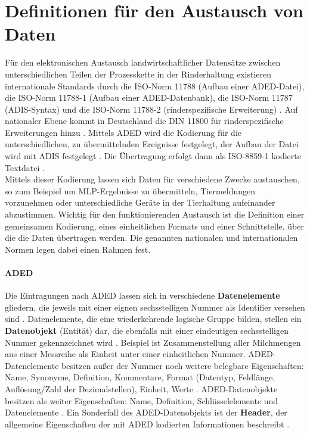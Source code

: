 \section{Definitionen für den Austausch von Daten}
Für den elektronischen Austausch landwirtschaftlicher Datensätze zwischen unterschiedlichen Teilen der Prozesskette in der Rinderhaltung existieren internationale Standards durch die ISO-Norm 11788 (Aufbau einer ADED-Datei), die ISO-Norm 11788-1 (Aufbau einer ADED-Datenbank), die ISO-Norm 11787 (ADIS-Syntax) und die ISO-Norm 11788-2 (rinderspezifische Erweiterung) \autocite[27]{n.n._adis/aded_2015}. Auf nationaler Ebene kommt in Deutschland die DIN 11800 für rinderspezifische Erweiterungen hinzu \autocite[27]{n.n._adis/aded_2015}. Mittels ADED wird die Kodierung für die unterschiedlichen, zu übermittelnden Ereignisse festgelegt, der Aufbau der Datei wird mit ADIS festgelegt \autocite{landeskontrollverband_nrw_e.v._lkv_????}. Die Übertragung erfolgt dann als ISO-8859-1 kodierte Textdatei \autocite[17]{n.n._adis/aded_2015}.\\
Mittels dieser Kodierung lassen sich Daten für verschiedene Zwecke austauschen, so zum Beispiel um MLP-Ergebnisse zu übermitteln, Tiermeldungen vorzunehmen oder unterschiedliche Geräte in der Tierhaltung aufeinander abzustimmen. Wichtig für den funktionierenden Austausch ist die Definition einer gemeinsamen Kodierung, eines einheitlichen Formats und einer Schnittstelle, über die die Daten übertragen werden. Die genannten nationalen und internationalen Normen legen dabei einen Rahmen fest.
\paragraph{ADED}
Die Eintragungen nach ADED lassen sich in verschiedene \textbf{Datenelemente} gliedern, die jeweils mit einer eignen sechsstelligen Nummer als Identifier versehen sind \autocite[16]{n.n._adis/aded_2015}. Datenelemente, die eine wiederkehrende logische Gruppe bilden, stellen ein \textbf{Datenobjekt} (Entität) dar, die ebenfalls mit einer eindeutigen sechsstelligen Nummer gekennzeichnet wird \autocite[17]{n.n._adis/aded_2015}. Beispiel ist Zusammenstellung aller Milchmengen aus einer Messreihe als Einheit unter einer einheitlichen Nummer. ADED-Datenelemente besitzen außer der Nummer noch weitere belegbare Eigenschaften: Name, Synonyme, Definition, Kommentare, Format (Datentyp, Feldlänge, Auflösung/Zahl der Dezimalstellen), Einheit, Werte \autocite[16]{n.n._adis/aded_2015}. ADED-Datenobjekte besitzen als weiter Eigenschaften: Name, Definition, Schlüsselelemente und Datenelemente \autocite[18]{n.n._adis/aded_2015}. Ein Sonderfall des ADED-Datenobjekts ist der \textbf{Header}, der allgemeine Eigenschaften der mit ADED kodierten Informationen beschreibt \autocite[19]{n.n._adis/aded_2015}.
